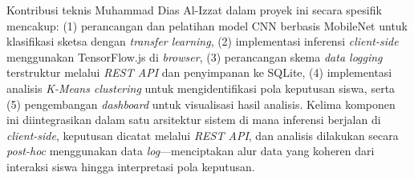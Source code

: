 Kontribusi teknis Muhammad Dias Al-Izzat dalam proyek ini secara spesifik mencakup: (1) perancangan dan pelatihan model CNN berbasis MobileNet untuk klasifikasi sketsa dengan \textit{transfer learning}, (2) implementasi inferensi \textit{client-side} menggunakan TensorFlow.js di \textit{browser}, (3) perancangan skema \textit{data logging} terstruktur melalui \textit{REST API} dan penyimpanan ke SQLite, (4) implementasi analisis \textit{K-Means clustering} untuk mengidentifikasi pola keputusan siswa, serta (5) pengembangan \textit{dashboard} untuk visualisasi hasil analisis. Kelima komponen ini diintegrasikan dalam satu arsitektur sistem di mana inferensi berjalan di \textit{client-side}, keputusan dicatat melalui \textit{REST API}, dan analisis dilakukan secara \textit{post-hoc} menggunakan data \textit{log}—menciptakan alur data yang koheren dari interaksi siswa hingga interpretasi pola keputusan.
